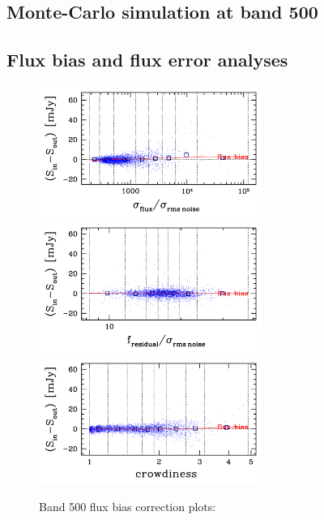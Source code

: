 \documentclass[11pt,a4paper]{article}
\begin{document}
\subsection{Monte-Carlo simulation at band 500}
\label{Band500_Galsim}


\subsection{Flux bias and flux error analyses}
\label{Band500_simanalyses}

\begin{figure}[H]
	\caption{
		Band 500 flux bias correction plots:
	}
	\includegraphics[width=0.65\textwidth]{galsim_500_fbias_1}
	\includegraphics[width=0.65\textwidth]{galsim_500_fbias_2}
	\includegraphics[width=0.65\textwidth]{galsim_500_fbias_3}
\end{figure}
\end{document}
